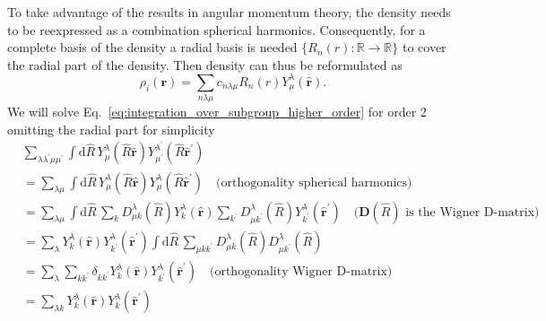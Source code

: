 To take advantage of the results in angular momentum theory\cite{yutsis1965theory}, the density needs to be reexpressed as a combination spherical harmonics.
Consequently, for a complete basis of the density a radial basis is needed $\{R_n(r) :\mathbb{R}\rightarrow\mathbb{R}\}$ to cover the radial part of the density.
Then density can thus be reformulated as
\begin{equation}
  \label{eq:radial_angular_density}
  \rho_i(\mathbf{r}) = \sum_{n\lambda\mu} c_{n\lambda\mu}R_n(r)Y^\lambda_\mu(\hat{\mathbf{r}}).
\end{equation}
We will solve Eq.~\ref{eq:integration_over_subgroup_higher_order} for order 2 omitting the radial part for simplicity
\begin{subequations}
  \label{eq:solving_haar_integral}
\begin{align}
  &\sum_{\lambda\lambda^\prime\mu\mu^\prime}\int \mathrm{d}\hat{R}\, Y^{\lambda}_\mu(\hat{R}\hat{\mathbf{r}})Y^{\lambda^\prime}_{\mu^\prime}(\hat{R}\hat{\mathbf{r}}^\prime)\\
  & = \sum_{\lambda\mu} \int \mathrm{d}\hat{R}\, Y^\lambda_\mu(\hat{R}\hat{\mathbf{r}})Y^\lambda_{\mu}(\hat{R}\hat{\mathbf{r}}^\prime) \quad \textrm{(orthogonality spherical harmonics)}\\
  & = \sum_{\lambda\mu} \int \mathrm{d}\hat{R}\, \sum_{k}D_{\mu k}^\lambda(\hat{R})Y^\lambda_k(\hat{\mathbf{r}})\sum_{k^\prime}D_{\mu k^\prime}^\lambda(\hat{R})Y^\lambda_{k^\prime}(\hat{\mathbf{r}}^\prime) \quad \textrm{($\mathbf{D}(\hat{R})$ is the Wigner D-matrix)}\\
  & = \sum_{\lambda} Y^\lambda_k(\hat{\mathbf{r}})Y^\lambda_{k^\prime}(\hat{\mathbf{r}}^\prime)\int \mathrm{d}\hat{R}\, \sum_{\mu kk^\prime}D_{\mu k}^\lambda(\hat{R})D_{\mu k^\prime}^\lambda(\hat{R})\\
  & = \sum_{\lambda} \sum_{kk^\prime}\delta_{kk^\prime} Y^\lambda_k(\hat{\mathbf{r}})Y^\lambda_{k^\prime}(\hat{\mathbf{r}}^\prime) \quad \textrm{(orthogonality Wigner D-matrix)}\\
  & = \sum_{\lambda k} Y^\lambda_k(\hat{\mathbf{r}})Y^\lambda_{k}(\hat{\mathbf{r}}^\prime)
\end{align}
\end{subequations}

